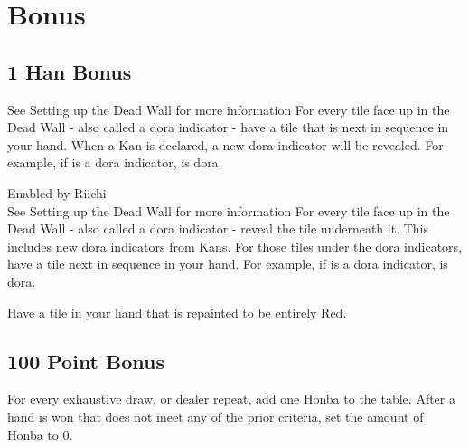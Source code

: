 \section{Bonus}\label{core:sec:bonus}

\subsection{1 Han Bonus}\label{core:ssec:1-han-bonus}

	{\upgradestoother See Setting up the Dead Wall for more information }
	{For every tile face up in the Dead Wall - also called a dora indicator - have a tile that is next in sequence in your hand. When a Kan is declared, a new dora indicator will be revealed. For example, if  is a dora indicator,  is dora.}

	{\upgradesfromother Enabled by Riichi \\
	\upgradestoother See Setting up the Dead Wall for more information }
	{For every tile face up in the Dead Wall - also called a dora indicator - reveal the tile underneath it. This includes new dora indicators from Kans. For those tiles under the dora indicators, have a tile next in sequence in your hand. For example, if  is a dora indicator,  is dora.}

	{}
	{Have a tile in your hand that is repainted to be entirely Red.}

\subsection{100 Point Bonus}\label{core:ssec:100-point-bonus}

	{}
	{For every exhaustive draw, or dealer repeat, add one Honba to the table. After a hand is won that does not meet any of the prior criteria, set the amount of Honba to 0.}
